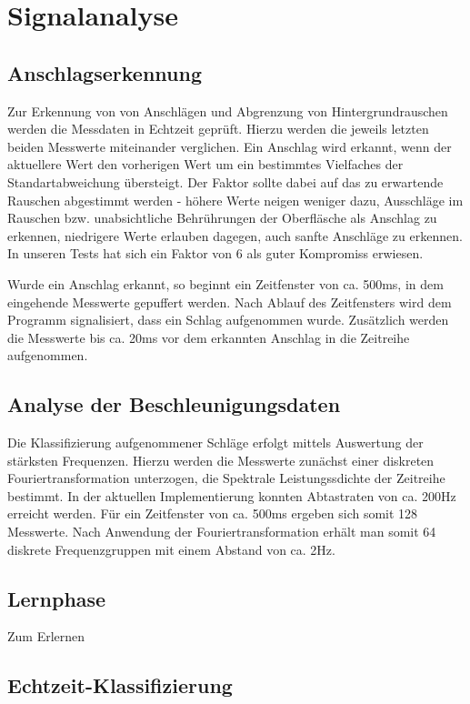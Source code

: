 \section*{Signalanalyse}
\subsection*{Anschlagserkennung}
Zur Erkennung von von Anschlägen und Abgrenzung von Hintergrundrauschen werden die Messdaten in Echtzeit geprüft. Hierzu werden die jeweils letzten beiden Messwerte miteinander verglichen. Ein Anschlag wird erkannt, wenn der aktuellere Wert den vorherigen Wert um ein bestimmtes Vielfaches der Standartabweichung übersteigt. Der Faktor sollte dabei auf das zu erwartende Rauschen abgestimmt werden - höhere Werte neigen weniger dazu, Ausschläge im Rauschen bzw. unabsichtliche Behrührungen der Oberfläsche als Anschlag zu erkennen, niedrigere Werte erlauben dagegen, auch sanfte Anschläge zu erkennen. In unseren Tests hat sich ein Faktor von 6 als guter Kompromiss erwiesen.

Wurde ein Anschlag erkannt, so beginnt ein Zeitfenster von ca. 500ms, in dem eingehende Messwerte gepuffert werden. Nach Ablauf des Zeitfensters wird dem Programm signalisiert, dass ein Schlag aufgenommen wurde. Zusätzlich werden die Messwerte bis ca. 20ms vor dem erkannten Anschlag in die Zeitreihe aufgenommen.

\subsection*{Analyse der Beschleunigungsdaten}
Die Klassifizierung aufgenommener Schläge erfolgt mittels Auswertung der stärksten Frequenzen. Hierzu werden die Messwerte zunächst einer diskreten Fouriertransformation unterzogen, die Spektrale Leistungssdichte der Zeitreihe bestimmt.
In der aktuellen Implementierung konnten Abtastraten von ca. 200Hz erreicht werden. Für ein Zeitfenster von ca. 500ms ergeben sich somit 128 Messwerte. Nach Anwendung der Fouriertransformation erhält man somit 64 diskrete Frequenzgruppen mit einem Abstand von ca. 2Hz.

\subsection*{Lernphase}
Zum Erlernen

\subsection*{Echtzeit-Klassifizierung}



